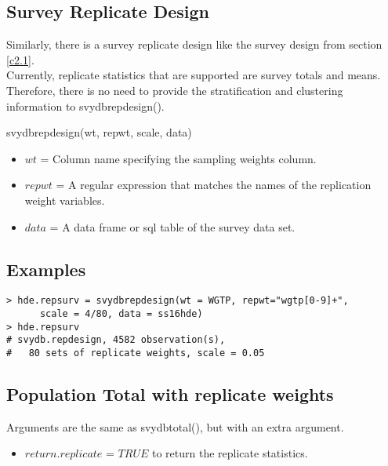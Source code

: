 \subsection{Survey Replicate Design}

Similarly, there is a survey replicate design like the survey design from section \ref{c2.1}.\\

Currently, replicate statistics that are supported are survey totals and means. Therefore, there is no need to provide the stratification and clustering information to {\ttfamily svydbrepdesign()}.

\begin{center}
    {\ttfamily svydbrepdesign(wt, repwt, scale, data)}
\end{center}

\begin{itemize}
\item $wt$ = Column name specifying the sampling weights column.

\item $repwt$ = A regular expression that matches the names of the replication weight variables.

\item $data$ = A data frame or sql table of the survey data set.
\end{itemize}

\subsection{Examples}
\begin{lstlisting}
> hde.repsurv = svydbrepdesign(wt = WGTP, repwt="wgtp[0-9]+", 
      scale = 4/80, data = ss16hde)
> hde.repsurv
# svydb.repdesign, 4582 observation(s), 
#   80 sets of replicate weights, scale = 0.05
\end{lstlisting}

\subsection{Population Total with replicate weights}

Arguments are the same as {\ttfamily svydbtotal()}, but with an extra argument. \\
\begin{itemize}
    \item $return.replicate$ = $TRUE$ to return the replicate statistics.
\end{itemize}

